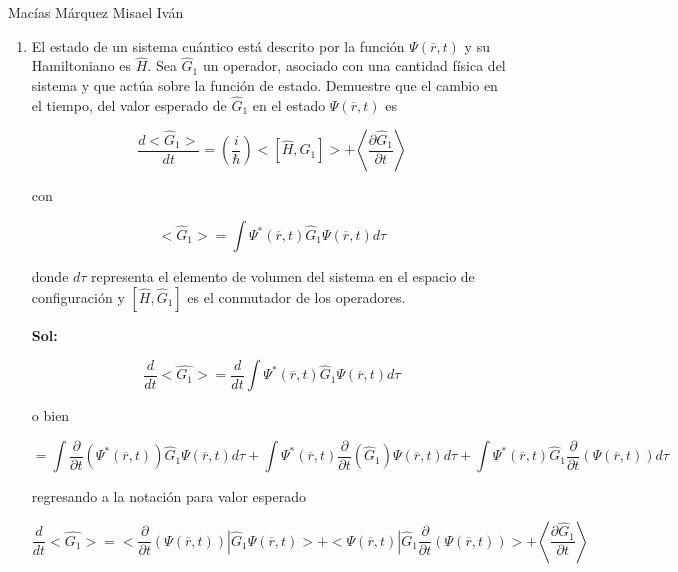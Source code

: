 \documentclass[12pt,a4paper]{article}
\begin{document}
Macías Márquez Misael Iván

\begin{enumerate}






\item El estado de un sistema cuántico está descrito por la función $\Psi(\overline{r},t)$ y su Hamiltoniano es $\hat{H}$. Sea $\hat{G}_{1}$ un operador, asociado con una cantidad física del sistema y que actúa sobre la función de estado. Demuestre que el cambio en el tiempo, del valor esperado de $\hat{G}_{1}$ en el estado $\Psi(\overline{r},t)$ es

\begin{equation*}
    \frac{d<\hat{G}_{1}>}{dt} = \left(\frac{i}{\hbar
    }\right) <[\hat{H},\hat{G}_{1}]> + \left<\frac{\partial \hat{G}_{1}}{\partial t}\right>
\end{equation*}

con 

\begin{equation*}
    <\hat{G}_{1}> = \int \Psi^{*}(\overline{r},t) \hat{G}_{1} \Psi(\overline{r},t) d\tau
\end{equation*}

donde $d\tau$ representa el elemento de volumen del sistema en el espacio de configuración y $[\hat{H},\hat{G}_{1}]$ es el conmutador de los operadores.

\textbf{Sol:}

\begin{equation*}
    \frac{d}{dt} <\hat{G_1}> = \frac{d}{dt} \int \Psi^{*}(\overline{r},t) \hat{G}_{1} \Psi(\overline{r},t) d\tau
\end{equation*}

o bien

\begin{equation*}
    = \int \frac{\partial}{\partial t}(\Psi^{*}(\overline{r},t)) \hat{G}_{1} \Psi(\overline{r},t) d\tau + \int \Psi^{*}(\overline{r},t)\frac{\partial}{\partial t}( \hat{G}_{1}) \Psi(\overline{r},t) d\tau + \int \Psi^{*}(\overline{r},t) \hat{G}_{1} \frac{\partial}{\partial t}(\Psi(\overline{r},t)) d\tau
\end{equation*}

regresando a la notación para valor esperado

\begin{equation*}
    \frac{d}{dt} <\hat{G_1}> = <\frac{\partial}{\partial t}(\Psi(\overline{r},t))|\hat{G}_1 \Psi(\overline{r},t) > + <\Psi(\overline{r},t)|\hat{G}_1\frac{\partial}{\partial t}(\Psi(\overline{r},t))> +  \left<\frac{\partial \hat{G}_1}{\partial t}\right>
\end{equation*}


\end{enumerate}
\end{document}

